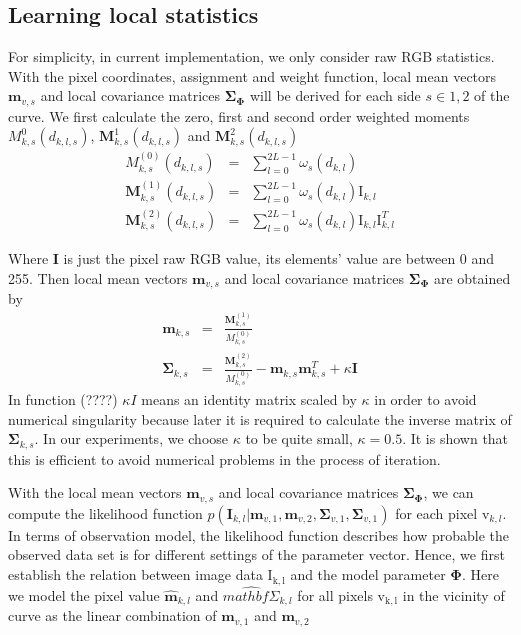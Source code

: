 \subsection{Learning local statistics}
\label{sec:lls}

For simplicity, in current implementation, we only consider raw RGB
statistics. With the pixel coordinates, assignment and weight
function, local mean vectors $\mathbf{m}_{v,s}$  and local covariance matrices
$\mathbf{\Sigma}_{\mathbf{\Phi}}$ will be derived for each side $s \in
{1,2}$ of the curve.
We first calculate the zero, first and second order weighted moments
$M_{k,s}^0(d_{k,l,s})$, $\mathbf{M}_{k,s}^1(d_{k,l,s})$ and $\mathbf{M}_{k,s}^2(d_{k,l,s})$
\begin{eqnarray}
  \label{eq:5.13}
  M_{k,s}^{(0)}(d_{k,l,s}) &=& \sum_{l=0}^{2L-1} \omega_s(d_{k,l})\\
  \mathbf{M}_{k,s}^{(1)}(d_{k,l,s}) &=& \sum_{l=0}^{2L-1} \omega_s(d_{k,l}) \mathrm{I}_{k,l}\\
  \mathbf{M}_{k,s}^{(2)}(d_{k,l,s}) &=& \sum_{l=0}^{2L-1} \omega_s(d_{k,l}) \mathrm{I}_{k,l}\mathrm{I}_{k,l}^T
\end{eqnarray}

Where $\mathbf{I}$ is just the pixel raw RGB value, its elements'
value are between 0 and 255. Then local mean vectors $\mathbf{m}_{v,s}$  and local covariance matrices
$\mathbf{\Sigma}_{\mathbf{\Phi}}$  are obtained by 
\begin{eqnarray}
  \label{eq:5.14}
  \mathbf{m}_{k,s} &=& \frac{\mathbf{M}^{(1)}_{k,s}}{M^{(0)}_{k,s}}\\
  \mathbf{\Sigma}_{k,s} &=& \frac{\mathbf{M}^{(2)}_{k,s}}{M^{(0)}_{k,s}}
  - \mathbf{m}_{k,s}\mathbf{m}_{k,s}^T  + \kappa \mathbf{I}
\end{eqnarray}
In function (????) $\kappa I$  means an identity matrix scaled by
$\kappa$ in order to avoid numerical singularity because later it is
required to calculate the inverse matrix of
$\mathbf{\Sigma}_{k,s}$. In our experiments, we choose $\kappa$ to be
quite small, $\kappa = 0.5$. It is shown that this is efficient to
avoid numerical problems in the process of iteration.

With the local mean vectors $\mathbf{m}_{v,s}$  and local covariance matrices
$\mathbf{\Sigma}_{\mathbf{\Phi}}$, we can compute the
likelihood function   $p(\mathbf{I}_{k,l} | \mathbf{m}_{v,1}, \mathbf{m}_{v,2},
  \mathbf{\Sigma}_{v,1}, \mathbf{\Sigma}_{v,1})$ for each pixel
  $\mathrm{v}_{k,l}$. In terms of observation model, the likelihood
  function describes how probable the observed data set is for
  different settings of the parameter vector. Hence, we first establish
  the relation between image data $\mathrm{I_{k,l}}$ and the model
  parameter $\mathbf{\Phi}$. Here we model the pixel value
  $\hat{\mathbf{m}}_{k,l}$ and $\hat{mathbf{\Sigma}}_{k,l}$
  for all pixels $\mathrm{v_{k,l}}$ in the vicinity of curve as the
  linear combination of $\mathbf{m}_{v,1}$ and $\mathbf{m}_{v,2}$

